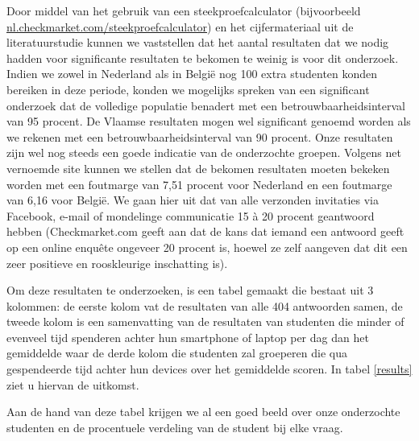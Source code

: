 Door middel van het gebruik van een steekproefcalculator (bijvoorbeeld \url{nl.checkmarket.com/steekproefcalculator}) en het cijfermateriaal uit de literatuurstudie kunnen we vaststellen dat het aantal resultaten dat we nodig hadden voor significante resultaten te bekomen te weinig is voor dit onderzoek. Indien we zowel in Nederland als in België nog 100 extra studenten konden bereiken in deze periode, konden we mogelijks spreken van een significant onderzoek dat de volledige populatie benadert met een betrouwbaarheidsinterval van 95 procent. De Vlaamse resultaten mogen wel significant genoemd worden als we rekenen met een betrouwbaarheidsinterval van 90 procent. Onze resultaten zijn wel nog steeds een goede indicatie van de onderzochte groepen. Volgens net vernoemde site kunnen we stellen dat de bekomen resultaten moeten bekeken worden met een foutmarge van 7,51 procent voor Nederland en een foutmarge van 6,16 voor België. We gaan hier uit dat van alle verzonden invitaties via Facebook, e-mail of mondelinge communicatie 15 à 20 procent geantwoord hebben (Checkmarket.com geeft aan dat de kans dat iemand een antwoord geeft op een online enquête ongeveer 20 procent is, hoewel ze zelf aangeven dat dit een zeer positieve en rooskleurige inschatting is).

Om deze resultaten te onderzoeken, is een tabel gemaakt die bestaat uit 3 kolommen: de eerste kolom vat de resultaten van alle 404 antwoorden samen, de tweede kolom is een samenvatting van de resultaten van studenten die minder of evenveel tijd spenderen achter hun smartphone of laptop per dag dan het gemiddelde waar de derde kolom die studenten zal groeperen die qua gespendeerde tijd achter hun devices over het gemiddelde scoren. In tabel \ref{results} ziet u hiervan de uitkomst.

Aan de hand van deze tabel krijgen we al een goed beeld over onze onderzochte studenten en de procentuele verdeling van de student bij elke vraag.

